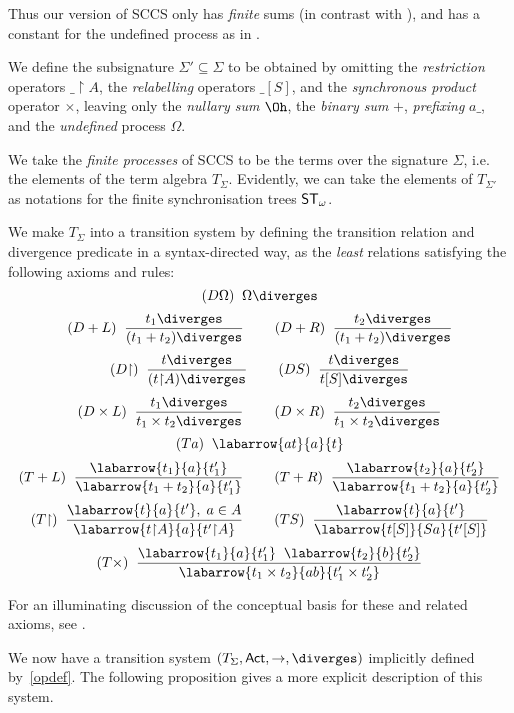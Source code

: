 Thus our version of SCCS only has {\em finite} sums (in contrast with \cite{Mil83}), and has a constant for the undefined process as in \cite{Hen81}.

We define the subsignature $\Sigma' \subseteq \Sigma$ to be obtained by omitting the {\it restriction} operators $\_{\restriction} A$, 
the {\it relabelling} operators $\_ [S]$, and the {\it synchronous product} operator $\times$, leaving only the {\it nullary sum} $\Oh$, the {\it binary sum} $+$, {\it prefixing} $a\_$, and the {\it undefined} process $\Omega$.

We take the {\em finite processes} of SCCS to be the terms over the signature $\Sigma$, i.e. the elements of the term algebra $T_{\Sigma}$.
Evidently, we can take the elements of $T_{\Sigma'}$ as notations for the finite synchronisation trees ${\sf ST}_{\omega}$.

\begin{definition}
\label{opdef}
{\rm We make $T_{\Sigma}$ into a transition system by defining the transition relation
and divergence predicate in a syntax-directed way, as the {\em least}
relations satisfying the following axioms and rules:}
\[ (D \Omega ) \;\; \Omega \diverges \]
\[ (D+L) \;\; \frac{t_{1} \diverges}{(t_{1} + t_{2}) \diverges} \;\;\;\;\;\;\;\; (D+R) \;\; \frac{t_{2} \diverges}{(t_{1} + t_{2}) \diverges} \]
\[ (D{\restriction} ) \;\; \frac{t \diverges}{(t {\restriction} A) \diverges} \;\;\;\;\;\;\;\; (DS) \;\; \frac{t \diverges}{t [S] \diverges} \]
\[ (D \times L) \;\; \frac{t_{1} \diverges}{t_{1} \times t_{2} \diverges} \;\;\;\;\;\;\;\; (D \times R) \;\; \frac{t_{2} \diverges}{t_{1} \times t_{2} \diverges} \]
\[ (Ta) \;\;  \labarrow{at}{a}{t} \]
\[ (T+L) \;\; \frac{\labarrow{t_{1}}{a}{t'_{1}}}{\labarrow{t_{1} + t_{2}}{a}{t'_{1}}} \;\;\;\;\;\;\;\; 
(T+R) \;\; \frac{\labarrow{t_{2}}{a}{t'_{2}}}{\labarrow{t_{1} + t_{2}}{a}{t'_{2}}} \]
\[ (T {\restriction} ) \;\; \frac{\labarrow{t}{a}{t'}, \; a \in A}{\labarrow{t {\restriction} A}{a}{t' {\restriction} A}} \;\;\;\;\;\;\;\; (TS) \;\; \frac{\labarrow{t}{a}{t'}}{\labarrow{t[S]}{S a}{t'[S]}} \]
\[ (T \times ) \;\; \frac{\labarrow{t_{1}}{a}{t'_{1}} \;\; \labarrow{t_{2}}{b}{t'_{2}}}{\labarrow{t_{1} \times t_{2}}{ab}{t'_{1} \times t'_{2}}} \] 
\end{definition}

For an illuminating discussion of the conceptual basis for these and related axioms, see \cite{Mil86}.

We now have a transition system $(T_{\Sigma}, {\sf Act}, {\rightarrow}, \diverges )$ implicitly defined by~\ref{opdef}.
The following proposition gives a more explicit description of this system.

